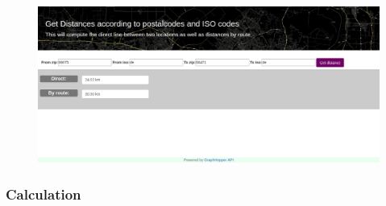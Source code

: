 \begin{figure}[H]
\hspace{-2.0cm}
\includegraphics[width=1.3\textwidth]{img/webapp}
\label{fig:webapp}
\end{figure}

\subsubsection{Calculation}

